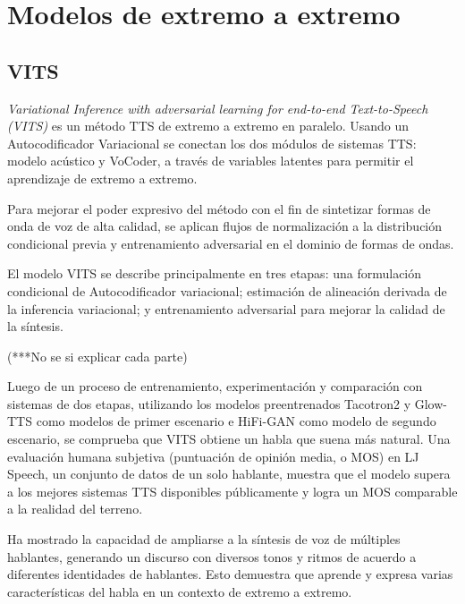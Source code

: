 \section{Modelos de extremo a extremo}
\subsection{VITS}

\textit{Variational Inference with adversarial learning for end-to-end Text-to-Speech (VITS)} es un método TTS de extremo a extremo en paralelo. Usando un Autocodificador Variacional se conectan los dos módulos de sistemas TTS: modelo acústico y VoCoder, a través de variables latentes para permitir el aprendizaje de extremo a extremo. 

Para mejorar el poder expresivo del método con el fin de sintetizar formas de onda de voz de alta calidad, se aplican flujos de normalización a la distribución condicional previa y entrenamiento adversarial en el dominio de formas de ondas.

El modelo VITS se describe principalmente en tres etapas: una formulación condicional de Autocodificador variacional; estimación de alineación derivada de la inferencia variacional; y entrenamiento adversarial para mejorar la calidad de la síntesis.

(***No se si explicar cada parte)



Luego de un proceso de entrenamiento, experimentación y comparación con sistemas de dos etapas, utilizando los modelos preentrenados Tacotron2 y Glow-TTS como modelos de primer escenario e HiFi-GAN como modelo de segundo escenario, se comprueba que VITS obtiene un habla que suena más natural. Una evaluación humana subjetiva (puntuación de opinión media, o MOS) en LJ Speech, un conjunto de datos de un solo hablante, muestra que el modelo supera a los mejores sistemas TTS disponibles públicamente y logra un MOS comparable a la realidad del terreno.

Ha mostrado la capacidad de ampliarse a la síntesis de voz de múltiples hablantes, generando un discurso con diversos tonos y ritmos de acuerdo a diferentes identidades de hablantes. Esto demuestra que aprende y expresa varias características del habla en un contexto de extremo a extremo.



